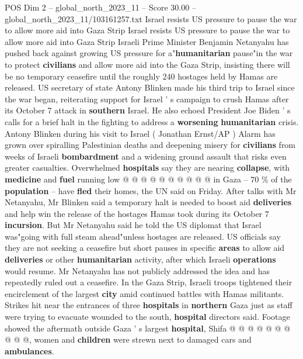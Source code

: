 \begin{textsample}{POS Dim 2 – global\_north\_2023\_11 – Score 30.00 – global\_north\_2023\_11/103161257.txt}  \label{ex:f2_pos_233}
Israel resists US pressure to pause the war to allow more aid into Gaza Strip Israel resists US pressure to pause the war to allow more aid into Gaza Strip Israeli Prime Minister Benjamin Netanyahu has pushed back against growing US pressure for a"\textbf{humanitarian} pause"in the war to protect \textbf{civilians} and allow more aid into the Gaza Strip, insisting there will be no temporary ceasefire until the roughly 240 hostages held by Hamas are released.
US secretary of state Antony Blinken made his third trip to Israel since the war began, reiterating support for Israel ' s campaign to crush Hamas after its October 7 attack in \textbf{southern} Israel.
He also echoed President Joe Biden ' s calls for a brief halt in the fighting to address a \textbf{worsening} \textbf{humanitarian} crisis.
Antony Blinken during his visit to Israel ( Jonathan Ernst/AP ) Alarm has grown over spiralling Palestinian deaths and deepening misery for \textbf{civilians} from weeks of Israeli \textbf{bombardment} and a widening ground assault that risks even greater casualties.
Overwhelmed \textbf{hospitals} say they are nearing \textbf{collapse}, with \textbf{medicine} and \textbf{fuel} running low @ @ @ @ @ @ @ @ @ @ in Gaza -- 70 \% of the \textbf{population} -- have \textbf{fled} their homes, the UN said on Friday.
After talks with Mr Netanyahu, Mr Blinken said a temporary halt is needed to boost aid \textbf{deliveries} and help win the release of the hostages Hamas took during its October 7 \textbf{incursion}.
But Mr Netanyahu said he told the US diplomat that Israel was"going with full steam ahead"unless hostages are released.
US officials say they are not seeking a ceasefire but short pauses in specific \textbf{areas} to allow aid \textbf{deliveries} or other \textbf{humanitarian} activity, after which Israeli \textbf{operations} would resume.
Mr Netanyahu has not publicly addressed the idea and has repeatedly ruled out a ceasefire.
In the Gaza Strip, Israeli troops tightened their encirclement of the largest \textbf{city} amid continued battles with Hamas militants.
Strikes hit near the entrances of three \textbf{hospitals} in \textbf{northern} Gaza just as staff were trying to evacuate wounded to the south, \textbf{hospital} directors said.
Footage showed the aftermath outside Gaza ' s largest \textbf{hospital}, Shifa @ @ @ @ @ @ @ @ @ @, women and \textbf{children} were strewn next to damaged cars and \textbf{ambulances}.

\end{textsample}
